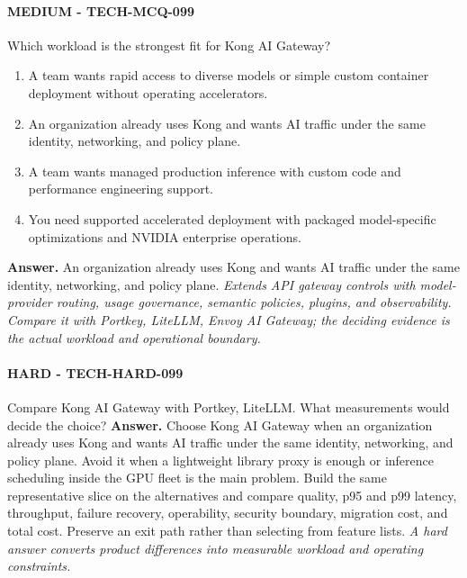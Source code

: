 \paragraph{MEDIUM - TECH-MCQ-099} Which workload is the strongest fit for Kong AI Gateway?
\begin{enumerate}[label=\Alph*.]
\item A team wants rapid access to diverse models or simple custom container deployment without operating accelerators.
\item An organization already uses Kong and wants AI traffic under the same identity, networking, and policy plane.
\item A team wants managed production inference with custom code and performance engineering support.
\item You need supported accelerated deployment with packaged model-specific optimizations and NVIDIA enterprise operations.
\end{enumerate}
\textbf{Answer.} An organization already uses Kong and wants AI traffic under the same identity, networking, and policy plane.
\textit{Extends API gateway controls with model-provider routing, usage governance, semantic policies, plugins, and observability. Compare it with Portkey, LiteLLM, Envoy AI Gateway; the deciding evidence is the actual workload and operational boundary.}
\paragraph{HARD - TECH-HARD-099} Compare Kong AI Gateway with Portkey, LiteLLM. What measurements would decide the choice?
\textbf{Answer.} Choose Kong AI Gateway when an organization already uses Kong and wants AI traffic under the same identity, networking, and policy plane. Avoid it when a lightweight library proxy is enough or inference scheduling inside the GPU fleet is the main problem. Build the same representative slice on the alternatives and compare quality, p95 and p99 latency, throughput, failure recovery, operability, security boundary, migration cost, and total cost. Preserve an exit path rather than selecting from feature lists.
\textit{A hard answer converts product differences into measurable workload and operating constraints.}

